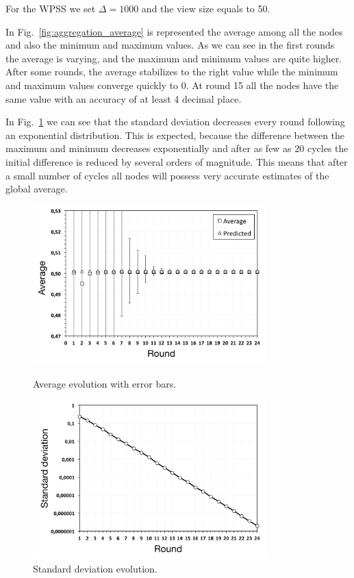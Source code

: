 For the \ac{WPSS} we set $\Delta = 1000$ and the view size equals to 50. 

In Fig.~\ref{fig:aggregation_average} is represented the average among all the nodes and also the minimum and maximum values. As we can see in the first rounds the average is varying, and the maximum and minimum values are quite higher. After some rounds, the average stabilizes to the right value while the minimum and maximum values converge quickly to 0. At round 15 all the nodes have the same value with an accuracy of at least 4 decimal place. 

In Fig.~\ref{fig:aggregation_standard_deviation} we can see that the standard deviation decreases every round following an exponential distribution. This is expected, because the difference between the maximum and minimum decreases exponentially and after as few as 20 cycles the initial difference is reduced by several orders of magnitude. This means that after a small number of cycles all nodes will possess very accurate estimates of the global average.

\begin{figure}[p]
\centering
\includegraphics[keepaspectratio=true, width=0.8\textwidth]{images/aggregation_average}
\caption{Average evolution with error bars.}
\label{fig:aggregation_average}
\includegraphics[keepaspectratio=true, width=0.8\textwidth]{images/aggregation_standard_deviation}
\caption{Standard deviation evolution.}
\label{fig:aggregation_standard_deviation}
\end{figure}

